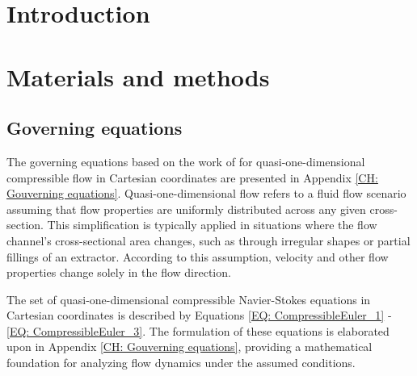 \documentclass[a4paper,fleqn]{cas-dc}
\begin{document}
\maketitle


\section{Introduction}


\section{Materials and methods} \label{CH: Materials and methods}

%

\subsection{Governing equations} \label{CH:Governing_equations_chapter}
	The governing equations based on the work of \citet{Anderson1995} for quasi-one-dimensional compressible flow in Cartesian coordinates are presented in Appendix \ref{CH: Gouverning equations}. Quasi-one-dimensional flow refers to a fluid flow scenario assuming that flow properties are uniformly distributed across any given cross-section. This simplification is typically applied in situations where the flow channel's cross-sectional area changes, such as through irregular shapes or partial fillings of an extractor. According to this assumption, velocity and other flow properties change solely in the flow direction.
	
	The set of quasi-one-dimensional compressible Navier-Stokes equations in Cartesian coordinates is described by Equations \ref{EQ: CompressibleEuler_1} - \ref{EQ: CompressibleEuler_3}. The formulation of these equations is elaborated upon in Appendix \ref{CH: Gouverning equations}, providing a mathematical foundation for analyzing flow dynamics under the assumed conditions.
\end{document}
